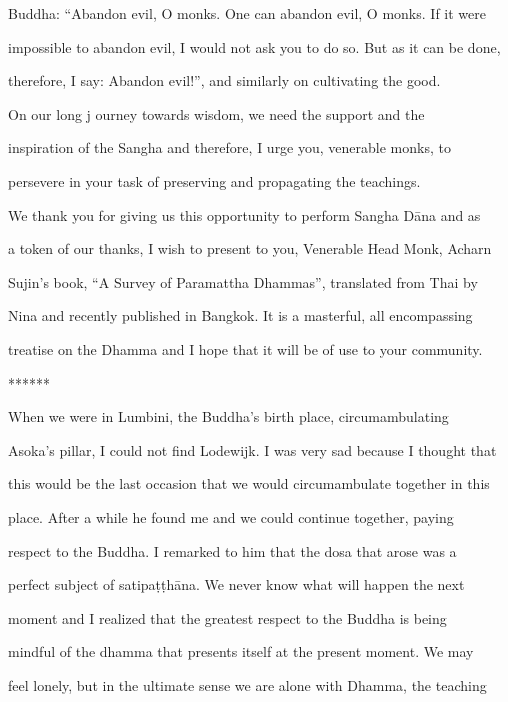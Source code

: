       Buddha: “Abandon evil, O monks. One can abandon evil, O monks. If it were  

      impossible to abandon evil, I would not ask you to do so. But as it can be done,  

      therefore, I say: Abandon evil!”, and similarly on cultivating the good. 

         On our long j ourney towards wisdom, we need the support and the  

      inspiration of the Sangha and therefore, I urge you, venerable monks, to  

      persevere in your task of preserving and propagating the teachings. 

         We thank you for giving us this opportunity to perform Sangha Dāna and as  

      a token of our thanks, I wish to present to you, Venerable Head Monk, Acharn  

      Sujin’s book, “A Survey of Paramattha Dhammas”, translated from Thai by  

      Nina and recently published in Bangkok. It is a masterful, all encompassing  

      treatise on the Dhamma and I hope that it will be of use to your community. 



                                             ****** 



When   we   were   in   Lumbini,   the   Buddha’s   birth   place,   circumambulating  

Asoka’s pillar, I could not find Lodewijk. I was very sad because I thought that  

this would be the last occasion that we would circumambulate together in this  

place.  After   a  while   he  found  me  and  we   could  continue  together,  paying  

respect  to  the  Buddha.  I  remarked  to  him  that  the  dosa  that   arose  was   a  

perfect  subject  of  satipaṭṭhāna.  We   never  know  what  will  happen  the  next  

moment   and   I   realized   that   the   greatest   respect   to   the   Buddha   is   being  

mindful  of the  dhamma that presents  itself  at the present  moment. We  may  

feel lonely, but in the ultimate sense we are alone with Dhamma, the teaching  

